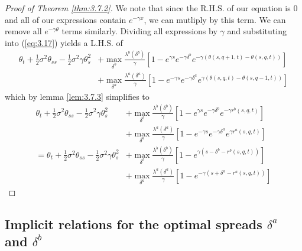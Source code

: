 \begin{proof}[Proof of Theorem \ref{thm:3.7.2}]
    We note that since the R.H.S. of our equation is 0 and all of our 
    expressions contain $e^{-\gamma x}$, we can mutliply by this term.
    We can remove all $e^{-\gamma \theta}$ terms similarly. Dividing 
    all expressions by $\gamma$ and substituting into (\ref{eq:3.17})
    yields a L.H.S. of
    \begin{align*}
        \theta_t+\frac{1}{2}\sigma^2\theta_{ss}-\frac{1}{2}\sigma^2\gamma\theta_s^2&+\max\limits_{\delta^b}\frac{\lambda^b(\delta^b)}{\gamma}[1-e^{\gamma s}e^{-\gamma \delta^b}e^{-\gamma(\theta(s,q+1,t)-\theta(s,q,t))}]\\
        &+\max\limits_{\delta^a}\frac{\lambda^a(\delta^a)}{\gamma}[1-e^{-\gamma s}e^{-\gamma\delta^a}e^{\gamma(\theta(s,q,t)-\theta(s,q-1,t))}]
    \end{align*}
    which by lemma \ref{lem:3.7.3} simplifies to
    \begin{align*}
        \theta_t+\frac{1}{2}\sigma^2\theta_{ss}-\frac{1}{2}\sigma^2\gamma\theta_s^2&+\max\limits_{\delta^b}\frac{\lambda^b(\delta^b)}{\gamma}[1-e^{\gamma s}e^{-\gamma \delta^b}e^{-\gamma r^b(s,q,t)}]\\
        &+\max\limits_{\delta^a}\frac{\lambda^a(\delta^a)}{\gamma}[1-e^{-\gamma s}e^{-\gamma\delta^a}e^{\gamma r^a(s,q,t)}]\\
        =\theta_t+\frac{1}{2}\sigma^2\theta_{ss}-\frac{1}{2}\sigma^2\gamma\theta_s^2&+\max\limits_{\delta^b}\frac{\lambda^b(\delta^b)}{\gamma}[1-e^{\gamma (s-\delta^b-r^b(s,q,t))}]\\
        &+\max\limits_{\delta^a}\frac{\lambda^a(\delta^a)}{\gamma}[1-e^{-\gamma (s+\delta^a-r^a(s,q,t))}]
    \end{align*}
\end{proof}

\subsection*{Implicit relations for the optimal spreads $\delta^a$ and $\delta^b$}

